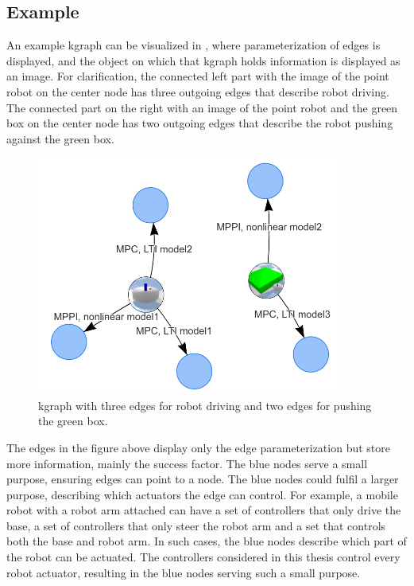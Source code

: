 \subsection{Example}%
\label{subsec:kgraph_example}
An example \ac{kgraph} can be visualized in , where parameterization of edges is displayed, and the object on which that \ac{kgraph} holds information is displayed as an image. For clarification, the connected left part with the image of the point robot on the center node has three outgoing edges that describe robot driving. The connected part on the right with an image of the point robot and the green box on the center node has two outgoing edges that describe the robot pushing against the green box.\bs

\begin{figure}[H]
    \centering
    \includegraphics[width=10cm]{figures/proposed_method/kgraph_example}
    \caption{\ac{kgraph} with three edges for robot driving and two edges for pushing the green box.}%
    \label{fig:kgraph_example}
\end{figure}

The edges in the figure above display only the edge parameterization but store more information, mainly the success factor. The blue nodes serve a small purpose, ensuring edges can point to a node. The blue nodes could fulfil a larger purpose, describing which actuators the edge can control. For example, a mobile robot with a robot arm attached can have a set of controllers that only drive the base, a set of controllers that only steer the robot arm and a set that controls both the base and robot arm. In such cases, the blue nodes describe which part of the robot can be actuated. The controllers considered in this thesis control every robot actuator, resulting in the blue nodes serving such a small purpose.\bs
